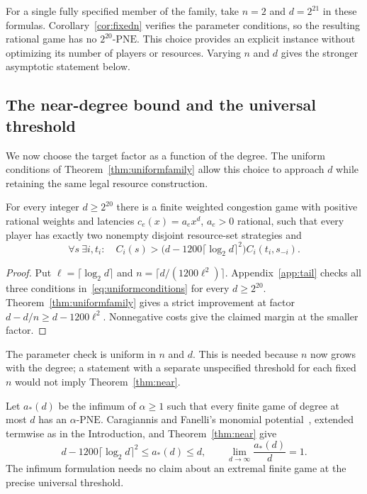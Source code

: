 \documentclass[manuscript,review,anonymous]{acmart}
\newcommand{\PNE}{\mathrm{PNE}}
\begin{document}
For a single fully specified member of the family, take $n=2$ and $d=2^{21}$ in these formulas. Corollary~\ref{cor:fixedn} verifies the parameter conditions, so the resulting rational game has no $2^{20}$-$\PNE$. This choice provides an explicit instance without optimizing its number of players or resources. Varying $n$ and $d$ gives the stronger asymptotic statement below.

\subsection{The near-degree bound and the universal threshold}
We now choose the target factor as a function of the degree. The uniform conditions of Theorem~\ref{thm:uniformfamily} allow this choice to approach $d$ while retaining the same legal resource construction.

\begin{theorem}\label{thm:near}
For every integer $d\ge2^{20}$ there is a finite weighted congestion game with positive rational weights and latencies $c_e(x)=a_ex^d$, $a_e>0$ rational, such that every player has exactly two nonempty disjoint resource-set strategies and
\begin{equation}\label{eq:nearlower}
 \forall s\ \exists i,t_i:\quad
 C_i(s)>\bigl(d-1200\lceil\log_2d\rceil^2\bigr)C_i(t_i,s_{-i}).
\end{equation}
\end{theorem}
\begin{proof}
Put $\ell=\lceil\log_2d\rceil$ and $n=\lceil d/(1200\ell^2)\rceil$. Appendix~\ref{app:tail} checks all three conditions in~\eqref{eq:uniformconditions} for every $d\ge2^{20}$. Theorem~\ref{thm:uniformfamily} gives a strict improvement at factor $d-d/n\ge d-1200\ell^2$. Nonnegative costs give the claimed margin at the smaller factor.
\end{proof}
The parameter check is uniform in $n$ and $d$. This is needed because $n$ now grows with the degree; a statement with a separate unspecified threshold for each fixed $n$ would not imply Theorem~\ref{thm:near}.

Let $a_*(d)$ be the infimum of $\alpha\ge1$ such that every finite game of degree at most $d$ has an $\alpha$-$\PNE$. Caragiannis and Fanelli's monomial potential~\cite[Theorem~2]{CF2021}, extended termwise as in the Introduction, and Theorem~\ref{thm:near} give
\begin{equation}\label{eq:universalthreshold}
 d-1200\lceil\log_2d\rceil^2\le a_*(d)\le d,
 \qquad \lim_{d\to\infty}\frac{a_*(d)}d=1.
\end{equation}
The infimum formulation needs no claim about an extremal finite game at the precise universal threshold.
\end{document}
